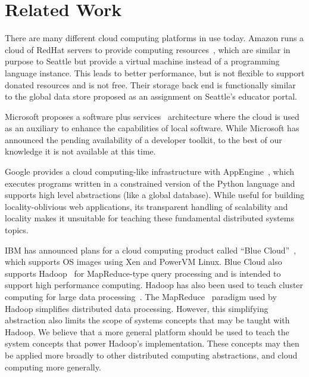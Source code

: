 \section{Related Work}
\label{sec-relatedwork}



There are many different cloud computing platforms in use today.
Amazon runs a cloud of RedHat servers to provide computing
resources~\cite{AmazonEC2},
which %
are similar in purpose to Seattle but provide a virtual machine
instead of a programming language instance. This leads to better
performance, but is not flexible to support donated resources and is
not free. Their storage back end is functionally similar to the global
data store proposed as an assignment on Seattle's educator portal.

Microsoft proposes a software plus services~\cite{MicrosoftMemo}
architecture where the cloud is used as an auxiliary to enhance the
capabilities of local software. While Microsoft has announced the
pending availability of a developer toolkit, to the best of our
knowledge it is not available at this time. %

Google provides a cloud computing-like infrastructure with
AppEngine~\cite{GoogleAppEngine}, which executes programs written in a
constrained version of the Python language and supports high level
abstractions (like a global database). While useful for building
locality-oblivious web applications, its transparent handling of
scalability and locality makes it unsuitable for teaching these
fundamental distributed systems topics.

IBM has announced plans for a cloud computing product called ``Blue
Cloud''~\cite{IBMBlueCloud}, which supports OS images using Xen and
PowerVM Linux. Blue Cloud also supports Hadoop~\cite{Hadoop} for
MapReduce-type query processing and is intended to support high
performance computing. %
Hadoop has also been used to teach cluster computing for large data
processing~\cite{SIGCSE08}. The MapReduce~\cite{MapReduce} paradigm
used by Hadoop simplifies distributed data processing. However, this
simplifying abstraction also limits the scope of systems concepts that
may be taught with Hadoop. We believe that a more general platform
should be used to teach the system concepts that power Hadoop's
implementation. These concepts may then be applied more broadly to
other distributed computing abstractions, and cloud computing more
generally.

